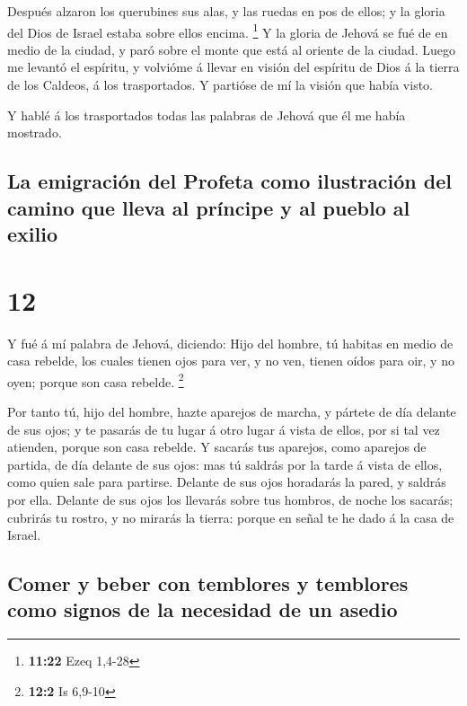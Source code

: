  Después alzaron los querubines sus alas, y las ruedas en
pos de ellos; y la gloria del Dios de Israel estaba sobre ellos encima.
\footnote{\textbf{11:22} Ezeq 1,4-28}  Y la gloria de
Jehová se fué de en medio de la ciudad, y paró sobre el monte que está
al oriente de la ciudad.  Luego me levantó el espíritu, y
volvióme á llevar en visión del espíritu de Dios á la tierra de los
Caldeos, á los trasportados. Y partióse de mí la visión que había visto.

 Y hablé á los trasportados todas las palabras de Jehová
que él me había mostrado.

\hypertarget{la-emigraciuxf3n-del-profeta-como-ilustraciuxf3n-del-camino-que-lleva-al-pruxedncipe-y-al-pueblo-al-exilio}{%
\subsection{La emigración del Profeta como ilustración del camino que
lleva al príncipe y al pueblo al
exilio}\label{la-emigraciuxf3n-del-profeta-como-ilustraciuxf3n-del-camino-que-lleva-al-pruxedncipe-y-al-pueblo-al-exilio}}

\hypertarget{section-11}{%
\section{12}\label{section-11}}

 Y fué á mí palabra de Jehová, diciendo:  Hijo
del hombre, tú habitas en medio de casa rebelde, los cuales tienen ojos
para ver, y no ven, tienen oídos para oir, y no oyen; porque son casa
rebelde. \footnote{\textbf{12:2} Is 6,9-10}

 Por tanto tú, hijo del hombre, hazte aparejos de marcha, y
pártete de día delante de sus ojos; y te pasarás de tu lugar á otro
lugar á vista de ellos, por si tal vez atienden, porque son casa
rebelde.  Y sacarás tus aparejos, como aparejos de partida,
de día delante de sus ojos: mas tú saldrás por la tarde á vista de
ellos, como quien sale para partirse.  Delante de sus ojos
horadarás la pared, y saldrás por ella.  Delante de sus ojos
los llevarás sobre tus hombros, de noche los sacarás; cubrirás tu
rostro, y no mirarás la tierra: porque en señal te he dado á la casa de
Israel.

\hypertarget{comer-y-beber-con-temblores-y-temblores-como-signos-de-la-necesidad-de-un-asedio}{%
\subsection{Comer y beber con temblores y temblores como signos de la
necesidad de un
asedio}\label{comer-y-beber-con-temblores-y-temblores-como-signos-de-la-necesidad-de-un-asedio}}

